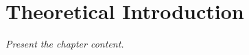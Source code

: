 
\chapter{Theoretical Introduction}
\label{cap:TheoreticalIntroduction}

\textit{Present the chapter content.}

%

%
%

\cleardoublepage
